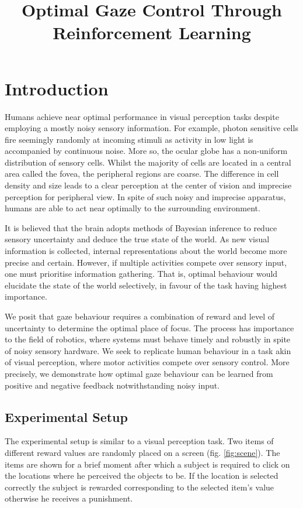 \documentclass[11]{article}
\author{}
\title{Optimal Gaze Control Through Reinforcement Learning}
\begin{document}
\maketitle 	

\section{Introduction}
Humans achieve near optimal performance in visual perception tasks\cite{najemnik2005,knill2004} despite employing a mostly noisy sensory information.
For example, photon sensitive cells fire seemingly randomly at incoming stimuli as activity in low light is accompanied by continuous noise\cite{baylor1984,vanrossum1998,field2002}.  
More so, the ocular globe has a non-uniform distribution of sensory cells.
Whilst the majority of cells are located in a central area called the fovea, the peripheral regions are coarse\cite{jonas1992,purves2001}. 
The difference in cell density and size leads to a clear perception at the center of vision and imprecise perception for peripheral view.  
In spite of such noisy and imprecise apparatus, humans are able to act near optimally to the surrounding environment. 

It is believed that the brain adopts methods of Bayesian inference to reduce sensory uncertainty and deduce the true state of the world\cite{rao2010,knill2004}.
As new visual information is collected, internal representations about the world become more precise and certain.
However, if multiple activities compete over sensory input, one must prioritise information gathering.
That is, optimal behaviour would elucidate the state of the world selectively, in favour of the task having highest importance.

We posit that gaze behaviour requires a combination of reward and level of uncertainty to determine the optimal place of focus.
The process has importance to the field of robotics, where systems must behave timely and robustly in spite of noisy sensory hardware.
We seek to replicate human behaviour in a task akin of visual perception, where motor activities compete over sensory control. 
More precisely, we demonstrate how optimal gaze behaviour can be learned from positive and negative feedback notwithstanding noisy input.

\subsection{Experimental Setup}
The experimental setup is similar to a visual perception task.
Two items of different reward values are randomly placed on a screen (fig. \ref{fig:scene}).
The items are shown for a brief moment after which a subject is required to click on the locations where he perceived the objects to be. 
If the location is selected correctly the subject is rewarded corresponding to the selected item's value otherwise he receives a punishment.
\end{document}
